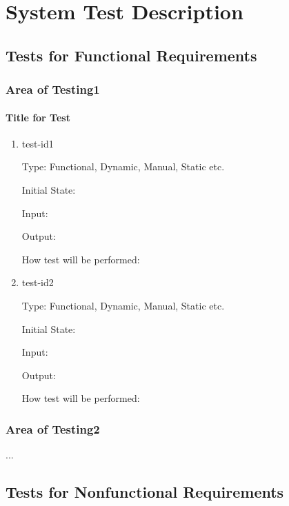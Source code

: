 \documentclass[12pt, titlepage]{article}
\begin{document}
\section{System Test Description}
	
\subsection{Tests for Functional Requirements}

\subsubsection{Area of Testing1}
		
\paragraph{Title for Test}

\begin{enumerate}

\item{test-id1\\}

Type: Functional, Dynamic, Manual, Static etc.
					
Initial State: 
					
Input: 
					
Output: 
					
How test will be performed: 
					
\item{test-id2\\}

Type: Functional, Dynamic, Manual, Static etc.
					
Initial State: 
					
Input: 
					
Output: 
					
How test will be performed: 

\end{enumerate}

\subsubsection{Area of Testing2}

...

\subsection{Tests for Nonfunctional Requirements}
\end{document}
